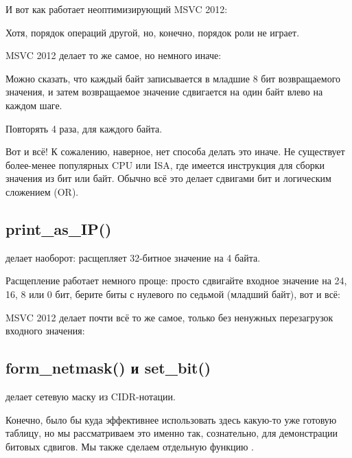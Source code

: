 И вот как работает неоптимизирующий MSVC 2012:



Хотя, порядок операций другой, но, конечно, порядок роли не играет.

\Optimizing MSVC 2012 делает то же самое, но немного иначе:



Можно сказать, что каждый байт записывается в младшие 8 бит возвращаемого значения,
и затем возвращаемое значение сдвигается на один байт влево на каждом шаге.

Повторять 4 раза, для каждого байта.

\par
Вот и всё! 
К сожалению, наверное, нет способа делать это иначе.
Не существует более-менее популярных \ac{CPU} или \ac{ISA}, где имеется инструкция для сборки значения из бит или байт.
Обычно всё это делает сдвигами бит и логическим сложением (OR).

\subsection{print\_as\_IP()}

 делает наоборот: расщепляет 32-битное значение на 4 байта.

Расщепление работает немного проще: просто сдвигайте входное значение на 24, 16, 8 или 0 бит,
берите биты с нулевого по седьмой (младший байт), вот и всё:



\Optimizing MSVC 2012 делает почти всё то же самое, только без ненужных перезагрузок входного значения:



\subsection{form\_netmask() и set\_bit()}

 делает сетевую маску из \ac{CIDR}-нотации.

Конечно, было бы куда эффективнее использовать здесь какую-то уже готовую таблицу, но мы рассматриваем
это именно так, сознательно, для демонстрации битовых сдвигов.
Мы также сделаем отдельную функцию . 

